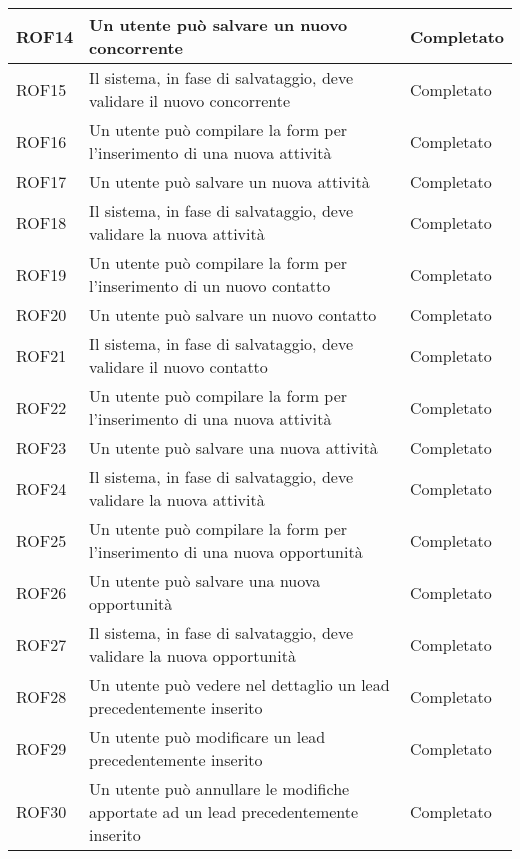\begin{longtable}[h]{|p{2.5cm}|p{8cm}|p{2.5cm}|}
	ROF14&Un utente può salvare un nuovo concorrente&Completato\\
	\hline
	\rule[-3mm]{0mm}{0.8cm}
	ROF15&Il sistema, in fase di salvataggio, deve validare il nuovo concorrente&Completato \\
	\hline
	\rule[-3mm]{0mm}{0.8cm}
	ROF16&Un utente può compilare la form per l'inserimento di una nuova attività  & Completato\\
	\hline
	\rule[-3mm]{0mm}{0.8cm}
	ROF17&Un utente può salvare un nuova attività&Completato\\
	\hline
	\rule[-3mm]{0mm}{0.8cm}
	ROF18&Il sistema, in fase di salvataggio, deve validare la nuova attività&Completato \\
	\hline
	\rule[-3mm]{0mm}{0.8cm}
	ROF19&Un utente può compilare la form per l'inserimento di un nuovo contatto&Completato\\
	\hline
	\rule[-3mm]{0mm}{0.8cm}
	ROF20&Un utente può salvare un nuovo contatto&Completato\\
	\hline
	\rule[-3mm]{0mm}{0.8cm}
	ROF21&Il sistema, in fase di salvataggio, deve validare il nuovo contatto&Completato \\
	\hline
	\rule[-3mm]{0mm}{0.8cm}
	ROF22&Un utente può compilare la form per l'inserimento di una nuova attività  &Completato\\
	\hline
	\rule[-3mm]{0mm}{0.8cm}
	ROF23&Un utente può salvare una nuova attività&Completato\\
	\hline
	\rule[-3mm]{0mm}{0.8cm}
	ROF24&Il sistema, in fase di salvataggio, deve validare la nuova attività&Completato \\
	\hline
	\rule[-3mm]{0mm}{0.8cm}
	ROF25&Un utente può compilare la form per l'inserimento di una nuova opportunità  &Completato\\
	\hline
	\rule[-3mm]{0mm}{0.8cm}
	ROF26&Un utente può salvare una nuova opportunità&Completato\\
	\hline
	\rule[-3mm]{0mm}{0.8cm}
	ROF27&Il sistema, in fase di salvataggio, deve validare la nuova opportunità&Completato \\
	\hline
	\rule[-3mm]{0mm}{0.8cm}
	ROF28&Un utente può vedere nel dettaglio un lead precedentemente inserito&Completato\\
	\hline
	\rule[-3mm]{0mm}{0.8cm}
	ROF29&Un utente può modificare un lead precedentemente inserito&Completato\\
	\hline
	\rule[-3mm]{0mm}{0.8cm}
	ROF30&Un utente può annullare le modifiche apportate ad un lead precedentemente inserito&Completato\\

\end{longtable}
